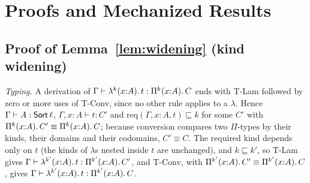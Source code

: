 \section{Proofs and Mechanized Results}\label{app:proofs}

\subsection*{Proof of Lemma~\ref{lem:widening} (kind widening)}

\emph{Typing.}
A derivation of $\Gamma \vdash \lambda^{k}(x{:}A).\,t : \Pi^{k}(x{:}A).\,C$ ends with T-Lam followed by zero or more uses of T-Conv, since no other rule applies to a $\lambda$.
Hence $\Gamma \vdash A : \mathsf{Sort}\,\ell$, $\Gamma, x{:}A \vdash t : C'$ and $\mathrm{req}(\Gamma, x{:}A, t) \sqsubseteq k$ for some $C'$ with $\Pi^{k}(x{:}A).\,C' \equiv \Pi^{k}(x{:}A).\,C$; because conversion compares two $\Pi$-types by their kinds, their domains and their codomains, $C' \equiv C$.
The required kind depends only on $t$ (the kinds of $\lambda$s nested inside $t$ are unchanged), and $k \sqsubseteq k'$, so T-Lam gives $\Gamma \vdash \lambda^{k'}(x{:}A).\,t : \Pi^{k'}(x{:}A).\,C'$, and T-Conv, with $\Pi^{k'}(x{:}A).\,C' \equiv \Pi^{k'}(x{:}A).\,C$, gives $\Gamma \vdash \lambda^{k'}(x{:}A).\,t : \Pi^{k'}(x{:}A).\,C$.

